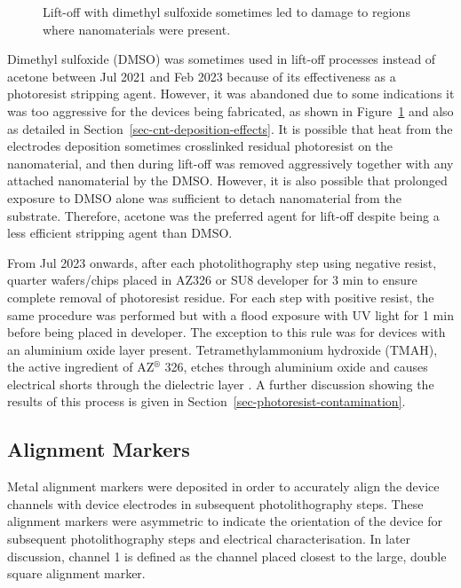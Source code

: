 \documentclass[
  a4paper,
]{scrbook}
\begin{document}
\begin{figure}
\begin{minipage}[t]{0.47\linewidth}
{{}

}

\end{minipage}%

\caption{\label{fig-dmso-damage}Lift-off with dimethyl sulfoxide
sometimes led to damage to regions where nanomaterials were present.}

\end{figure}

Dimethyl sulfoxide (DMSO) was sometimes used in lift-off processes
instead of acetone between Jul 2021 and Feb 2023 because of its
effectiveness as a photoresist stripping agent. However, it was
abandoned due to some indications it was too aggressive for the devices
being fabricated, as shown in Figure~\ref{fig-dmso-damage} and also as
detailed in Section~\ref{sec-cnt-deposition-effects}. It is possible
that heat from the electrodes deposition sometimes crosslinked residual
photoresist on the nanomaterial, and then during lift-off was removed
aggressively together with any attached nanomaterial by the DMSO.
However, it is also possible that prolonged exposure to DMSO alone was
sufficient to detach nanomaterial from the substrate. Therefore, acetone
was the preferred agent for lift-off despite being a less efficient
stripping agent than DMSO.

From Jul 2023 onwards, after each photolithography step using negative
resist, quarter wafers/chips placed in AZ326 or SU8 developer for 3 min
to ensure complete removal of photoresist residue. For each step with
positive resist, the same procedure was performed but with a flood
exposure with UV light for 1 min before being placed in developer. The
exception to this rule was for devices with an aluminium oxide layer
present. Tetramethylammonium hydroxide (TMAH), the active ingredient of
AZ\(^\circledR\) 326, etches through aluminium oxide and causes
electrical shorts through the dielectric layer
\autocite{Oh2011,Ali2021}. A further discussion showing the results of
this process is given in Section~\ref{sec-photoresist-contamination}.

\hypertarget{sec-align}{%
\subsection{Alignment Markers}\label{sec-align}}

Metal alignment markers were deposited in order to accurately align the
device channels with device electrodes in subsequent photolithography
steps. These alignment markers were asymmetric to indicate the
orientation of the device for subsequent photolithography steps and
electrical characterisation. In later discussion, channel 1 is defined
as the channel placed closest to the large, double square alignment
marker.
\end{document}
